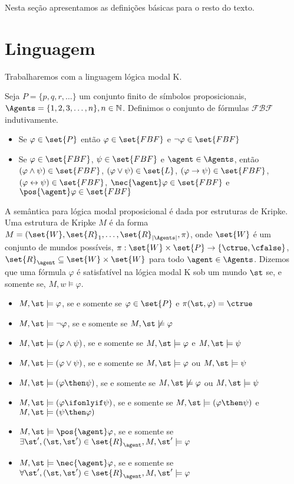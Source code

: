 
Nesta seção apresentamos as definições básicas para o resto do texto.

\section{Linguagem}
Trabalharemos com a linguagem lógica modal K.

\begin{definition}
Seja $P = \{p, q, r, \dots\}$ um conjunto finito de símbolos proposicionais, $\Agents = \{1, 2, 3, \dots, n\}, n \in \mathbb{N}$. Definimos o conjunto de fórmulas $\mathcal{FBF}$ indutivamente.

\begin{itemize}
\item Se $\varphi \in \set{P}$ então $\varphi \in \set{FBF}$ e $\neg\varphi \in \set{FBF}$
\item Se $\varphi \in \set{FBF}$, $\psi \in \set{FBF}$ e $\agent \in \Agents$, então $(\varphi \land \psi) \in \set{FBF}$, $(\varphi \lor \psi) \in \set{L}$, $(\varphi \rightarrow \psi) \in \set{FBF}$, $(\varphi \leftrightarrow \psi) \in \set{FBF}$, $\nec{\agent} \varphi \in \set{FBF}$ e $\pos{\agent} \varphi \in \set{FBF}$
\end{itemize}
\end{definition}


A semântica para lógica modal proposicional é dada por estruturas de Kripke. Uma estrutura de Kripke $M$ é da forma $M = (\set{W}, \set{R}_1, \ldots, \set{R}_{|\Agents|}, \pi)$, onde %
$\set{W}$ é um conjunto de mundos possíveis, $\pi:\set{W} \times \set{P} \rightarrow \{\ctrue, \cfalse\}$, $\set{R}_\agent \subseteq \set{W} \times \set{W}$ para todo $\agent \in \Agents$. Dizemos que uma fórmula $\varphi$ é satisfatível na lógica modal K sob um mundo $\st$ se, e somente se, $M,w \models \varphi$.

\begin{itemize}
\item $M,\st \models \varphi$, se e somente se $\varphi \in \set{P}$ e $\pi(\st, \varphi) = \ctrue$
\item $M,\st \models \neg\varphi$, se e somente se $M,\st \not\models \varphi$
\item $M,\st \models (\varphi \land \psi)$, se e somente se $M,\st \models \varphi$ e $M,\st \models \psi $
\item $M,\st \models (\varphi \lor \psi)$, se e somente se $M,\st \models \varphi$ ou $M,\st \models \psi $
\item $M,\st \models (\varphi \then \psi)$, se e somente se $M,\st \not\models \varphi$ ou $M,\st \models \psi $
\item $M,\st \models (\varphi \ifonlyif \psi)$, se e somente se $M,\st \models (\varphi \then \psi)$ e $M,\st \models (\psi \then \varphi)$

\item $M,\st \models \pos{\agent}\varphi$, se e somente se $\exists\st', (\st, \st') \in \set{R}_\agent, M,\st' \models \varphi$
\item $M,\st \models \nec{\agent}\varphi$, se e somente se $\forall\st', (\st, \st') \in \set{R}_\agent, M,\st' \models \varphi$

\end{itemize}

